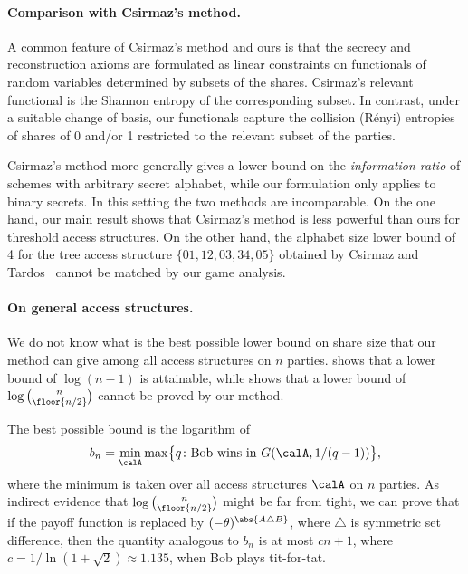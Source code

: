 \documentclass{toc}
\begin{document}
\paragraph{Comparison with Csirmaz's method.}
A common feature of Csirmaz's method and ours is that the secrecy and reconstruction axioms are formulated as linear constraints on functionals of random variables determined by subsets of the shares.  Csirmaz's relevant functional is the Shannon entropy of the corresponding subset.  In contrast, under a suitable change of basis, our functionals capture the collision (R{\'e}nyi) entropies of shares of 0 and/or 1 restricted to the relevant subset of the parties.  

Csirmaz's method more generally gives a lower bound on  
the \emph{information ratio} of schemes with arbitrary secret alphabet, while our formulation only applies to binary secrets.  In this setting the two methods are incomparable.  On the one hand, our main result shows that Csirmaz's method is less powerful than ours for threshold access structures.  On the other hand, the alphabet size lower bound of 4 for the tree access structure $\{01, 12, 03, 34, 05\}$ obtained by Csirmaz and Tardos~\cite{csirmaz-tardos} cannot be matched by our game analysis.


\paragraph{On general access structures.}
We do not know what is the best possible lower bound on share size that our method can give among all access structures on $n$ parties.   shows that a lower bound of $\log (n - 1)$ is attainable, while  shows that a lower bound of $\log\binom{n}{\floor{n/2}}$ 
cannot be proved by our method. 

The best possible bound is the logarithm of
\[ b_n = \min_\text{$\calA$} \max \bigl\{q\colon \text{Bob wins in $G(\calA, 1/(q-1))$}\bigr\}, \]
where the minimum is taken over all access structures $\calA$ on $n$ parties.  As indirect evidence that $\log\binom{n}{\floor{n/2}}$  might be far from tight, we can prove that if the payoff function is replaced by $(-\theta)^{\abs{A \triangle B}}$, where $\triangle$ is symmetric set difference, then the quantity analogous to $b_n$ is at most 
$cn + 1$, where $c = 1/\ln(1 + \sqrt{2}) \approx 1.135$, 
when Bob plays tit-for-tat.
\end{document}
